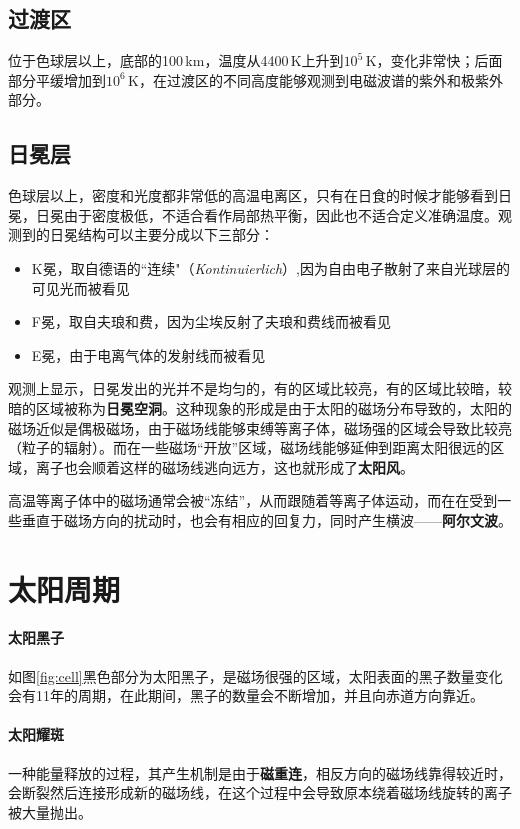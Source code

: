 \subsection{过渡区}
位于色球层以上，底部的100\,km，温度从4400\,K上升到$10^5$\,K，变化非常快；后面部分平缓增加到$10^6$\,K，在过渡区的不同高度能够观测到电磁波谱的紫外和极紫外部分。

\subsection{日冕层}
色球层以上，密度和光度都非常低的高温电离区，只有在日食的时候才能够看到日冕，日冕由于密度极低，不适合看作局部热平衡，因此也不适合定义准确温度。观测到的日冕结构可以主要分成以下三部分：
\begin{itemize}
  \item K冕，取自德语的``连续"（\textit{Kontinuierlich}）,因为自由电子散射了来自光球层的可见光而被看见
  \item F冕，取自夫琅和费，因为尘埃反射了夫琅和费线而被看见
  \item E冕，由于电离气体的发射线而被看见
\end{itemize}

观测上显示，日冕发出的光并不是均匀的，有的区域比较亮，有的区域比较暗，较暗的区域被称为\textbf{日冕空洞}。这种现象的形成是由于太阳的磁场分布导致的，太阳的磁场近似是偶极磁场，由于磁场线能够束缚等离子体，磁场强的区域会导致比较亮（粒子的辐射）。而在一些磁场``开放''区域，磁场线能够延伸到距离太阳很远的区域，离子也会顺着这样的磁场线逃向远方，这也就形成了\textbf{太阳风}。

高温等离子体中的磁场通常会被``冻结''，从而跟随着等离子体运动，而在在受到一些垂直于磁场方向的扰动时，也会有相应的回复力，同时产生横波——\textbf{阿尔文波}。

\section{太阳周期}
\paragraph{太阳黑子}
如图\ref{fig:cell}黑色部分为太阳黑子，是磁场很强的区域，太阳表面的黑子数量变化会有11年的周期，在此期间，黑子的数量会不断增加，并且向赤道方向靠近。

\paragraph{太阳耀斑}
一种能量释放的过程，其产生机制是由于\textbf{磁重连}，相反方向的磁场线靠得较近时，会断裂然后连接形成新的磁场线，在这个过程中会导致原本绕着磁场线旋转的离子被大量抛出。

